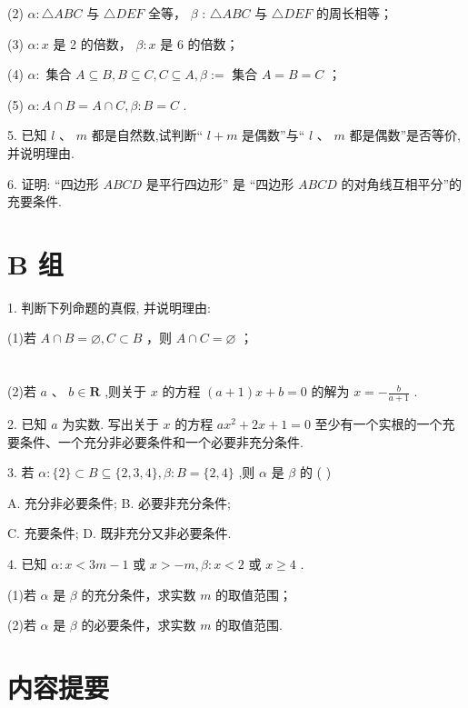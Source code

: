 \documentclass[10pt]{article}
\begin{document}
(2) \(\alpha  : {\bigtriangleup {ABC}}\) 与 \(\bigtriangleup  {DEF}\) 全等， \(\beta\) : \({\bigtriangleup {ABC}}\) 与 \(\bigtriangleup  {DEF}\) 的周长相等；

(3) \(\alpha  : x\) 是 2 的倍数， \(\beta  : x\) 是 6 的倍数；

(4) \(\alpha  :\) 集合 \(A \subseteq  B,B \subseteq  C,C \subseteq  A,\beta  \mathrel{\text{ := }}\) 集合 \(A = B = C\) ；

(5) \(\alpha  : A \cap  B = A \cap  C,\beta  : B = C\) .

5. 已知 \(l\text{ 、 }m\) 都是自然数,试判断“ \(l + m\) 是偶数”与“ \(l\text{ 、 }m\) 都是偶数”是否等价,并说明理由.

6. 证明: “四边形 \({ABCD}\) 是平行四边形” 是 “四边形 \({ABCD}\) 的对角线互相平分”的充要条件.

\section*{B 组}

1. 判断下列命题的真假, 并说明理由:

(1)若 \(A \cap  B = \varnothing ,C \subset  B\) ，则 \(A \cap  C = \varnothing\) ；



\section*{}

(2)若 \(a\text{ 、 }b \in  \mathbf{R}\) ,则关于 \(x\) 的方程 \(\left( {a + 1}\right) x + b = 0\) 的解为 \(x =  - \frac{b}{a + 1}\) .

2. 已知 \(a\) 为实数. 写出关于 \(x\) 的方程 \(a{x}^{2} + {2x} + 1 = 0\) 至少有一个实根的一个充要条件、一个充分非必要条件和一个必要非充分条件.

3. 若 \(\alpha  : \{ 2\}  \subset  B \subseteq  \{ 2,3,4\} ,\beta  : B = \{ 2,4\}\) ,则 \(\alpha\) 是 \(\beta\) 的 ( )

A. 充分非必要条件; B. 必要非充分条件;

C. 充要条件; D. 既非充分又非必要条件.

4. 已知 \(\alpha  : x < {3m} - 1\) 或 \(x >  - m,\beta  : x < 2\) 或 \(x \geq  4\) .

(1)若 \(\alpha\) 是 \(\beta\) 的充分条件，求实数 \(m\) 的取值范围；

(2)若 \(\alpha\) 是 \(\beta\) 的必要条件，求实数 \(m\) 的取值范围.



\section*{内容提要}
\end{document}
